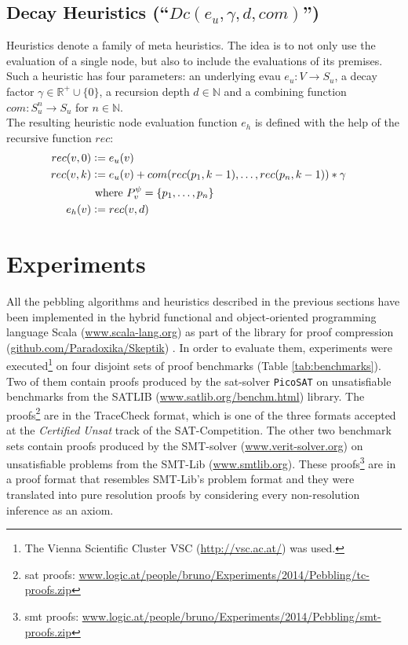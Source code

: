 \documentclass{llncs}
\newcommand{\defeq}{\mathrel{\mathop:}=}
\begin{document}
\subsection{Decay Heuristics (``$Dc(e_u,\gamma,d,com)$'') }
\label{sec:decay}
 Heuristics denote a family of meta heuristics. 
The idea is to not only use the evaluation of a single node, but also to include the evaluations of its premises.
Such a heuristic has four parameters: an underlying evau $e_u: V \rightarrow S_u$, a decay factor $\gamma \in \mathbb{R}^+ \cup \{0\}$, a recursion depth $d \in \mathbb{N}$ and a combining function $com: S_u^n \rightarrow S_u$ for $n \in \mathbb{N}$.\\
The resulting heuristic node evaluation function $e_h$ is defined with the help of the recursive function $rec$:
\begin{align*}
	rec(\n,0) &\defeq e_u(\n) \\
	rec(\n,k) &\defeq e_u(\n) + com(rec(p_1,k-1),\ldots,rec(p_n,k-1)) * \gamma\\
	& \text{ where } \Premises{\n}{\psi} = \{p_1,\ldots,p_n\}\\
	e_h(\n) &\defeq rec(\n,d) &
\end{align*}


\section{Experiments} 
\label{sec:exp}


All the pebbling algorithms and heuristics described in the previous sections have been implemented in the hybrid functional and object-oriented programming
language Scala (\url{www.scala-lang.org}) as part of the \skeptik library for proof compression (\url{github.com/Paradoxika/Skeptik}) \cite{Skeptik}.
In order to evaluate them, experiments were executed\footnote{The Vienna Scientific Cluster VSC 
(\url{http://vsc.ac.at/}) was used.} on four disjoint sets of proof benchmarks (Table \ref{tab:benchmarks}). Two of them contain proofs produced by the sat-solver \texttt{PicoSAT} \cite{Biere_picosatessentials} on unsatisfiable benchmarks from the SATLIB (\url{www.satlib.org/benchm.html}) library. The proofs\footnote{sat proofs: \url{www.logic.at/people/bruno/Experiments/2014/Pebbling/tc-proofs.zip}} are in the TraceCheck format, which is one of the three formats accepted at the \emph{Certified Unsat} track of the SAT-Competition.
The other two benchmark sets contain proofs produced by the SMT-solver {\veriT} (\url{www.verit-solver.org}) 
on unsatisfiable problems from the SMT-Lib (\url{www.smtlib.org}). These proofs\footnote{smt proofs: \url{www.logic.at/people/bruno/Experiments/2014/Pebbling/smt-proofs.zip}} are in a proof format that resembles SMT-Lib's problem format and they were translated into pure resolution proofs by considering every non-resolution inference as an axiom.
\end{document}
